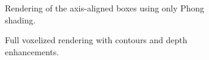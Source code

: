 \begin{figure}
\begin{subfigure}[b]{0.21\textwidth}
    \caption{Rendering of the axis-aligned boxes using only Phong shading.}
    \label{contributions:usar:rendering:default}
\end{subfigure}
\hspace*{2.5mm}
\begin{subfigure}[b]{0.21\textwidth}
    \caption{Full voxelized rendering with contours and depth enhancements.}
    \label{contributions:usar:rendering:voxel}
\end{subfigure}
\hspace*{2.5mm}
\begin{subfigure}[b]{0.21\textwidth}

\end{subfigure}
\end{figure}
